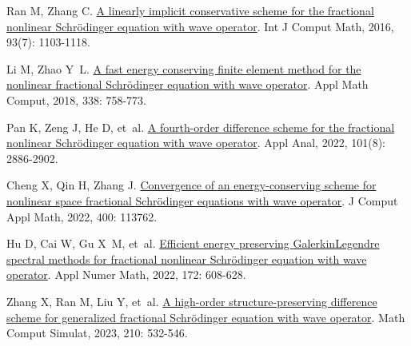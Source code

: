 \begin{thebibliography}{79}
    Ran M, Zhang C.
    \newblock \href{http://www.tandfonline.com/doi/full/10.1080/00207160.2015.1016924}{A linearly implicit conservative scheme for the fractional nonlinear {{Schr{\"o}dinger}} equation with wave operator}\allowbreak[J].
    \newblock Int J Comput Math, 2016, 93\allowbreak (7): 1103-1118.
    
    Li M, Zhao Y~L.
    \newblock \href{https://linkinghub.elsevier.com/retrieve/pii/S0096300318304983}{A fast energy conserving finite element method for the nonlinear fractional {{Schr{\"o}dinger}} equation with wave operator}\allowbreak[J].
    \newblock Appl Math Comput, 2018, 338: 758-773.
    
    Pan K, Zeng J, He D, et~al.
    \newblock \href{https://doi.org/10.1080/00036811.2020.1829600}{A fourth-order difference scheme for the fractional nonlinear {{Schr{\"o}dinger}} equation with wave operator}\allowbreak[J].
    \newblock Appl Anal, 2022, 101\allowbreak (8): 2886-2902.

    Cheng X, Qin H, Zhang J.
    \newblock \href{https://linkinghub.elsevier.com/retrieve/pii/S0377042721003848}{Convergence of an energy-conserving scheme for nonlinear space fractional {{Schr{\"o}dinger}} equations with wave operator}\allowbreak[J].
    \newblock J Comput Appl Math, 2022, 400: 113762.
    
    Hu D, Cai W, Gu X~M, et~al.
    \newblock \href{https://linkinghub.elsevier.com/retrieve/pii/S0168927421002981}{Efficient energy preserving {{Galerkin}}{\textendash}{{Legendre}} spectral methods for fractional nonlinear {{Schr{\"o}dinger}} equation with wave operator}\allowbreak[J].
    \newblock Appl Numer Math, 2022, 172: 608-628.
    
    Zhang X, Ran M, Liu Y, et~al.
    \newblock \href{https://www.sciencedirect.com/science/article/pii/S0378475423001325}{A high-order structure-preserving difference scheme for generalized fractional {{Schr{\"o}dinger}} equation with wave operator}\allowbreak[J].
    \newblock Math Comput Simulat, 2023, 210: 532-546.
    

\end{thebibliography}
